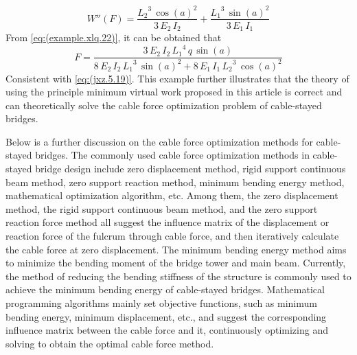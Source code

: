 \begin{equation}\label{eq:(example.xlq.22)}
W''(F)=\frac{{L_2 }^3 \,{\cos \left(a\right)}^2 }{3\,E_2 \,I_2 }+\frac{{L_1 }^3 \,{\sin \left(a\right)}^2 }{3\,E_1 \,I_1 }
\end{equation}
From \ref{eq:(example.xlq.22)}, it can be obtained that
\begin{equation}\label{eq:(example.xlq.23)}
F=\frac{3\,E_2 \,I_2 \,{L_1 }^4 \,q\,\sin \left(a\right)}{8\,E_2 \,I_2 \,{L_1 }^3 \,{\sin \left(a\right)}^2 +8\,E_1 \,I_1 \,{L_2 }^3 \,{\cos \left(a\right)}^2 }
\end{equation}
Consistent with \ref{eq:(jxz.5.19)}.
This example further illustrates that the theory of using the principle minimum virtual work proposed in this article is correct and can theoretically solve the cable force optimization problem of cable-stayed bridges.

Below is a further discussion on the cable force optimization methods for cable-stayed bridges. The commonly used cable force optimization methods in cable-stayed bridge design include zero displacement method, rigid support continuous beam method, zero support reaction method, minimum bending energy method, mathematical optimization algorithm, etc. Among them, the zero displacement method, the rigid support continuous beam method, and the zero support reaction force method all suggest the influence matrix of the displacement or reaction force of the fulcrum through cable force, and then iteratively calculate the cable force at zero displacement. The minimum bending energy method aims to minimize the bending moment of the bridge tower and main beam. Currently, the method of reducing the bending stiffness of the structure is commonly used to achieve the minimum bending energy of cable-stayed bridges. Mathematical programming algorithms mainly set objective functions, such as minimum bending energy, minimum displacement, etc., and suggest the corresponding influence matrix between the cable force and it, continuously optimizing and solving to obtain the optimal cable force method.

